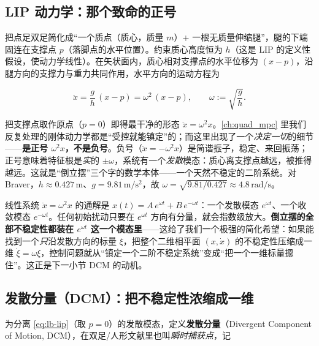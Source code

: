 \subsection{LIP 动力学：那个致命的正号}
\label{subsec:lb-lip-dyn}

把点足双足简化成“一个质点（质心，质量 $m$）+ 一根无质量伸缩腿”，腿的下端固连在支撑点 $p$（落脚点的水平位置）。约束质心高度恒为 $h$（这是 LIP 的定义性假设，使动力学线性）。在矢状面内，质心相对支撑点的水平位移为 $(x-p)$，沿腿方向的支撑力与重力共同作用，水平方向的运动方程为

\begin{equation}
  \ddot{x}=\frac{g}{h}\,(x-p)=\omega^2\,(x-p),
  \qquad
  \omega:=\sqrt{\frac{g}{h}}.
  \label{eq:lb-lip}
\end{equation}

把支撑点取作原点（$p=0$）即得最干净的形态 $\ddot x=\omega^2 x$。\cref{ch:quad_mpc} 里我们反复处理的刚体动力学都是“受控就能镇定”的；而这里出现了一个\emph{决定一切}的细节——\textbf{是正号 $\omega^2 x$，不是负号}。负号（$\ddot x=-\omega^2 x$）是简谐振子，稳定、来回振荡；正号意味着特征根是\emph{实}的 $\pm\omega$，系统有一个\emph{发散}模态：质心离支撑点越远，被推得越远。这就是“倒立摆”三个字的数学本体——一个天然不稳定的二阶系统。对 Braver，$h\approx 0.427\,\mathrm{m}$、$g=9.81\,\mathrm{m/s^2}$，故 $\omega=\sqrt{9.81/0.427}\approx 4.8\,\mathrm{rad/s}$。

\begin{insight}\label{ins:lb-positive-sign}
线性系统 $\ddot x=\omega^2 x$ 的通解是 $x(t)=A\,e^{\omega t}+B\,e^{-\omega t}$：一个发散模态 $e^{\omega t}$、一个收敛模态 $e^{-\omega t}$。任何初始扰动只要在 $e^{\omega t}$ 方向有分量，就会指数级放大。\textbf{倒立摆的全部不稳定性都装在 $e^{\omega t}$ 这一个模态里}——这给了我们一个极强的简化希望：如果能找到一个\emph{只}沿发散方向的标量 $\xi$，把整个二维相平面 $(x,\dot x)$ 的不稳定性压缩成一维 $\dot\xi=\omega\xi$，控制问题就从“镇定一个二阶不稳定系统”变成“把一个一维标量摁住”。这正是下一小节 DCM 的动机。
\end{insight}

\subsection{发散分量（DCM）：把不稳定性浓缩成一维}
\label{subsec:lb-dcm}

为分离 \cref{eq:lb-lip}（取 $p=0$）的发散模态，定义\textbf{发散分量}（Divergent Component of Motion, DCM），在双足/人形文献里也叫\emph{瞬时捕获点}，记

